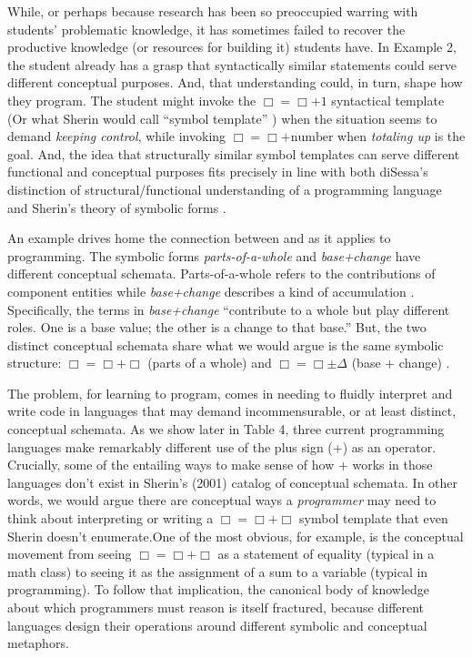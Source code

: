 While, or perhaps because
research has been so preoccupied warring with students' problematic
knowledge, it has sometimes failed to recover the productive knowledge
(or resources for building it) students have. In Example 2, the
student already has a grasp that syntactically similar statements could
serve different conceptual purposes. And, that understanding could, in turn, shape how they program. The student might
invoke the $\Box=︎ \Box + 1$ syntactical
template (Or what Sherin would call ``symbol template'' \cite{sherin_how_2001}) when the situation seems to demand \emph{keeping control},
while invoking $\Box= ︎\Box + \mathrm{number}$ when \emph{totaling up} is the goal.
And, the idea that structurally similar symbol templates can serve
different functional and conceptual purposes fits precisely in line with both diSessa's distinction of structural/functional understanding of a programming language \cite{disessa_models_1986} and
Sherin's theory of symbolic forms \cite{sherin_how_2001}.

An example drives home the connection between \cite{disessa_models_1986} and \cite{sherin_how_2001} as it applies to programming. The symbolic
forms \emph{parts-of-a-whole} and \emph{base+change} have different
conceptual schemata. Parts-of-a-whole refers to the contributions of
component entities while \emph{base+change} describes a kind of accumulation \cite{sherin_how_2001}.
Specifically, the terms in \emph{base+change} ``contribute to a whole but play different roles. One is a base value; the other is a change to that base.'' But, the two distinct conceptual schemata share what we
would argue is the same symbolic structure: $\Box=︎ \Box + \Box$ (parts of a whole) and $\Box = \Box \pm \Delta$ (base + change) \cite{sherin_how_2001}.

The problem, for learning to program, comes in needing to fluidly
interpret and write code in languages that may demand incommensurable,
or at least distinct, conceptual schemata. As we show later in Table 4,
three current programming languages make remarkably different use of the
plus sign (+) as an operator. Crucially, some of the entailing ways to
make sense of how + works in those languages don't exist in Sherin's
(2001) catalog of conceptual schemata. In other words, we would argue
there are conceptual ways a \emph{programmer} may need to think about
interpreting or writing a $\Box=︎ \Box +\Box$ symbol template that even Sherin \cite{sherin_how_2001} doesn't
enumerate.One of the most obvious, for example, is the conceptual movement from seeing
  $\Box=︎ \Box +\Box$ as a statement of equality (typical in a math class) to seeing it as the assignment of a
  sum to a variable (typical in programming). To follow that implication, the canonical body of
knowledge about which programmers must reason is itself fractured,
because different languages design their operations around different
symbolic and conceptual metaphors.

